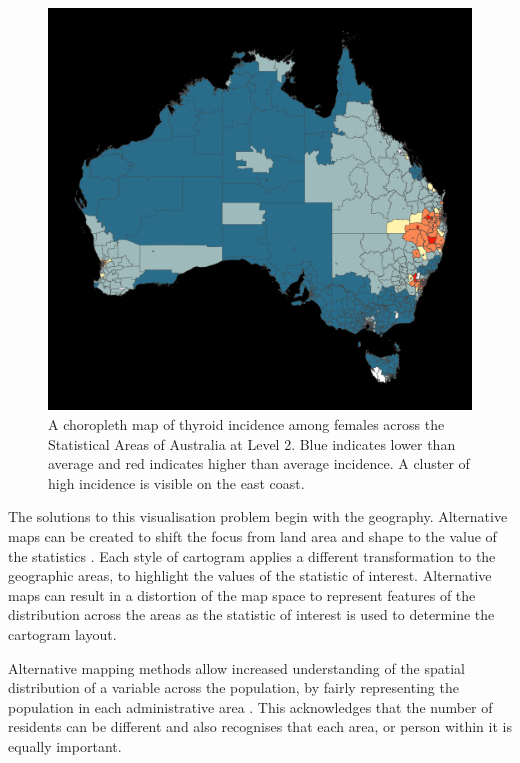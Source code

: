 \begin{Schunk}
\begin{figure}
\includegraphics[width=0.95\linewidth]{kobakian-cook_files/figure-latex/choro-1} \caption[A choropleth map of thyroid incidence among females across the Statistical Areas of Australia at Level 2]{A choropleth map of thyroid incidence among females across the Statistical Areas of Australia at Level 2. Blue indicates lower than average and red indicates higher than average incidence. A cluster of high incidence is visible on the east coast.}\label{fig:choro}
\end{figure}
\end{Schunk}

The solutions to this visualisation problem begin with the geography.
Alternative maps can be created to shift the focus from land area and
shape to the value of the statistics \citep{ACCAC}. Each style of
cartogram applies a different transformation to the geographic areas, to
highlight the values of the statistic of interest. Alternative maps can
result in a distortion of the map space to represent features of the
distribution across the areas \citep{ACCAC} as the statistic of interest
is used to determine the cartogram layout.

Alternative mapping methods allow increased understanding of the spatial
distribution of a variable across the population, by fairly representing
the population in each administrative area \citep{TAAM}. This
acknowledges that the number of residents can be different and also
recognises that each area, or person within it is equally important.

